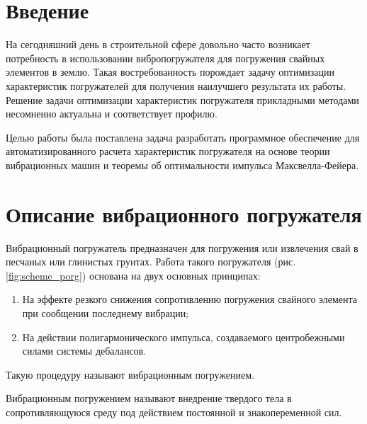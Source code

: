 \section*{Введение}

На сегодняшний день в строительной сфере довольно часто возникает потребность в использовании вибропогружателя для погружения свайных элементов в землю.
Такая востребованность порождает задачу оптимизации характеристик погружателей для получения наилучшего результата их работы.
Решение задачи оптимизации характеристик погружателя прикладными методами несомненно актуальна и соответствует профилю.

Целью работы была поставлена задача разработать программное обеспечение для автоматизированного расчета характеристик погружателя
на основе теории вибрационных машин и теоремы об оптимальности импульса Максвелла-Фейера.



\clearpage
\section{Описание вибрационного погружателя}

Вибрационный погружатель предназначен для погружения или извлечения свай в песчаных или глинистых грунтах.
Работа такого погружателя (рис. \ref{fig:scheme_porg}) основана на двух основных принципах:
\begin{enumerate} 
    \item На эффекте резкого снижения сопротивлению погружения свайного элемента при сообщении последнему вибрации;
    \item На действии полигармонического импульса, создаваемого центробежными силами системы дебалансов.
\end{enumerate}

Такую процедуру называют вибрационным погружением.

\begin{definition}
    Вибрационным погружением называют внедрение твердого тела в сопротивляющуюся среду под действием постоянной и знакопеременной сил.
\end{definition}

